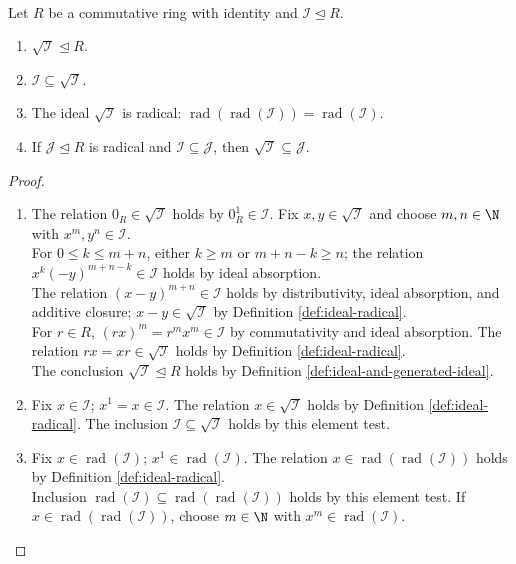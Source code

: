 \begin{proposition} \label{prop:ideal-radical-closure} \\
Let $R$ be a commutative ring with identity and $\mathcal{I}\trianglelefteq R$.
\begin{enumerate}[label=(\roman*)]
\setlength{\itemsep}{0pt}
\item $\sqrt{\mathcal{I}}\trianglelefteq R$.
\item $\mathcal{I}\subseteq\sqrt{\mathcal{I}}$.
\item The ideal $\sqrt{\mathcal{I}}$ is radical: $\operatorname{rad}(\operatorname{rad}(\mathcal{I}))=\operatorname{rad}(\mathcal{I})$.
\item If $\mathcal{J}\trianglelefteq R$ is radical and $\mathcal{I}\subseteq\mathcal{J}$, then $\sqrt{\mathcal{I}}\subseteq\mathcal{J}$.
\end{enumerate}
\begin{proof}
\begin{enumerate}[label=(\roman*)]
\setlength{\itemsep}{0pt}
\item The relation $0_R\in\sqrt{\mathcal{I}}$ holds by $0_R^1\in\mathcal{I}$. Fix $x,y\in\sqrt{\mathcal{I}}$ and choose $m,n\in\N$ with $x^m,y^n\in\mathcal{I}$.\\
For $0\leq k\leq m+n$, either $k\geq m$ or $m+n-k\geq n$; the relation $x^k(-y)^{m+n-k}\in\mathcal{I}$ holds by ideal absorption.\\
The relation $(x-y)^{m+n}\in\mathcal{I}$ holds by distributivity, ideal absorption, and additive closure; $x-y\in\sqrt{\mathcal{I}}$ by Definition \ref{def:ideal-radical}.\\
For $r\in R$, $(rx)^m=r^mx^m\in\mathcal{I}$ by commutativity and ideal absorption. The relation $rx=xr\in\sqrt{\mathcal{I}}$ holds by Definition \ref{def:ideal-radical}.\\
The conclusion $\sqrt{\mathcal{I}}\trianglelefteq R$ holds by Definition \ref{def:ideal-and-generated-ideal}.
\item Fix $x\in\mathcal{I}$; $x^1=x\in\mathcal{I}$. The relation $x\in\sqrt{\mathcal{I}}$ holds by Definition \ref{def:ideal-radical}. The inclusion $\mathcal{I}\subseteq\sqrt{\mathcal{I}}$ holds by this element test.
\item Fix $x\in\operatorname{rad}(\mathcal{I})$; $x^1\in\operatorname{rad}(\mathcal{I})$. The relation $x\in\operatorname{rad}(\operatorname{rad}(\mathcal{I}))$ holds by Definition \ref{def:ideal-radical}.\\
Inclusion $\operatorname{rad}(\mathcal{I})\subseteq\operatorname{rad}(\operatorname{rad}(\mathcal{I}))$ holds by this element test. If $x\in\operatorname{rad}(\operatorname{rad}(\mathcal{I}))$, choose $m\in\N$ with $x^m\in\operatorname{rad}(\mathcal{I})$.\\

\end{enumerate}
\end{proof}
\end{proposition}

